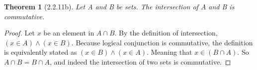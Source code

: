 \documentclass[a4paper, 12pt]{article}
\theoremstyle{plain}
\newtheorem*{theorem*}{Theorem}
\begin{document}
	
	\begin{theorem*}[2.2.11b]
		Let A and B be sets. The intersection of A and B is commutative.
	\end{theorem*}
	
	\begin{proof}
		Let $x$ be an element in $A \cap B$. By the definition of intersection, $(x \in A) \land (x \in B)$. Because logical conjunction is commutative, the definition is equivalently stated as $(x \in B) \land (x \in A)$. Meaning that $x \in (B \cap A)$. So $A \cap B = B \cap A$, and indeed the intersection of two sets is commutative.
	\end{proof}
\end{document}
